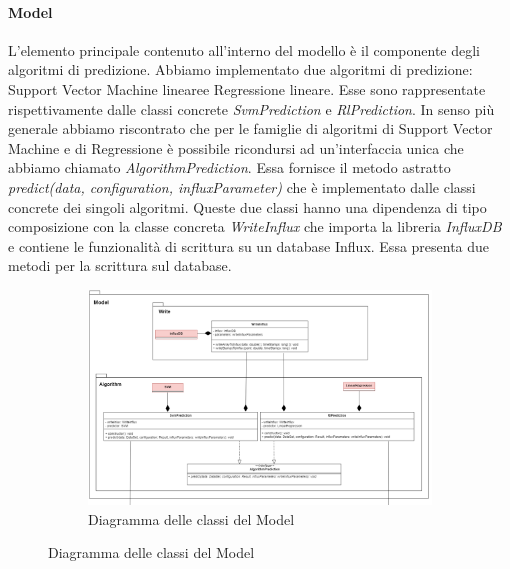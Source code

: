 \paragraph{Model} \mbox{}
L'elemento principale contenuto all'interno del modello è il componente degli algoritmi di predizione. Abbiamo implementato due algoritmi di predizione: Support Vector Machine lineare\glosp e Regressione lineare\glo. Esse sono rappresentate rispettivamente dalle classi concrete \textit{SvmPrediction} e \textit{RlPrediction}. In senso più generale abbiamo riscontrato che per le famiglie di algoritmi di Support Vector Machine e di Regressione è possibile ricondursi ad un'interfaccia unica che abbiamo chiamato \textit{AlgorithmPrediction}. Essa fornisce il metodo astratto \textit{predict(data, configuration, influxParameter)} che è implementato dalle classi concrete dei singoli algoritmi.
Queste due classi hanno una dipendenza di tipo composizione con la classe concreta \textit{WriteInflux} che importa la libreria \textit{InfluxDB} e contiene le funzionalità di scrittura su un database Influx. Essa presenta due metodi per la scrittura sul database.
\mbox{}
\begin{landscape}
	\begin{figure}
		\begin{figure} [H]
			\includegraphics[width=\linewidth]{./img/Diagrammi/model-plug-in.png}
			\caption{Diagramma delle classi del Model}
		\end{figure}
	\end{figure}
\end{landscape}

